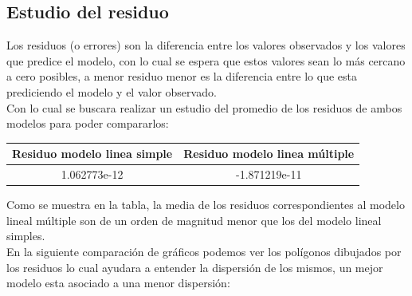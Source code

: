 \subsection{Estudio del residuo}

Los residuos (o errores) son la diferencia entre los valores observados y los valores que predice el modelo, con lo cual se espera que estos valores sean lo más cercano a cero posibles, a menor residuo menor es la diferencia entre lo que esta prediciendo el modelo y el valor observado.\\
Con lo cual se buscara realizar un estudio del promedio de los residuos de ambos modelos para poder compararlos:\\



\begin{center}
 \begin{tabular}{||c c||} 
 \hline
    Residuo modelo linea simple & Residuo modelo linea múltiple \\ 
 \hline
 1.062773e-12 & -1.871219e-11 \\
 \hline
 \hline
\end{tabular}
\end{center}

Como se muestra en la tabla, la media de los residuos correspondientes al modelo lineal múltiple son de un orden de magnitud menor que los del modelo lineal simples.\\

En la siguiente comparación de gráficos podemos ver los polígonos dibujados por los residuos lo cual ayudara a entender la dispersión de los mismos, un mejor modelo esta asociado a una menor dispersión:


